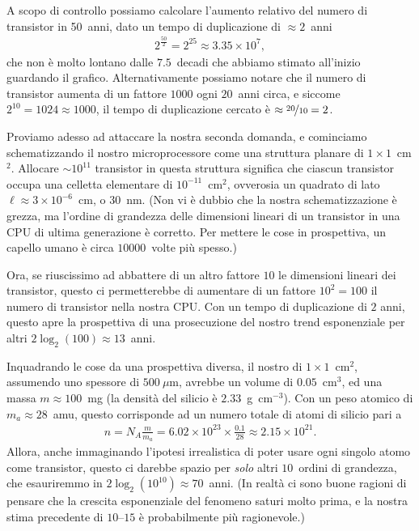 A scopo di controllo possiamo calcolare l'aumento relativo del numero di
transistor in 50~anni, dato un tempo di duplicazione di $\approx 2$~anni
\begin{align*}
  2^{\frac{50}{2}} = 2^{25} \approx 3.35 \times 10^7,
\end{align*}
che non è molto lontano dalle $7.5$~decadi che abbiamo stimato all'inizio
guardando il grafico. Alternativamente possiamo notare che il numero di
transistor aumenta di un fattore $1000$ ogni $20$~anni circa, e siccome
$2^{10} = 1024 \approx 1000$, il tempo di duplicazione cercato è
$\approx \nicefrac{20}{10} = 2$.

Proviamo adesso ad attaccare la nostra seconda domanda, e cominciamo schematizzando
il nostro microprocessore come una struttura planare di $1 \times 1$~cm$^2$.
Allocare $\sim 10^{11}$ transistor in questa struttura significa che
ciascun transistor occupa una celletta elementare di $10^{-11}$~cm$^2$, ovverosia
un quadrato di lato $\ell \approx 3 \times 10^{-6}$~cm, o $30$~nm. (Non vi è
dubbio che la nostra schematizzazione è grezza, ma l'ordine di grandezza delle
dimensioni lineari di un transistor in una CPU di ultima generazione è corretto.
Per mettere le cose in prospettiva, un capello umano è circa $10000$~volte
più spesso.)

Ora, se riuscissimo ad abbattere di un altro fattore $10$ le dimensioni lineari
dei transistor, questo ci permetterebbe di aumentare di un fattore $10^2 = 100$
il numero di transistor nella nostra CPU. Con un tempo di duplicazione di $2$
anni, questo apre la prospettiva di una prosecuzione del nostro trend esponenziale
per altri $2 \log_2(100) \approx 13$~anni.

Inquadrando le cose da una prospettiva diversa, il nostro  di
$1 \times 1$~cm$^2$, assumendo uno spessore di $500~\mu$m, avrebbe un volume di
$0.05$~cm$^3$, ed una massa $m \approx 100$~mg (la densità del silicio è $2.33$~g~cm$^{-3}$).
Con un peso atomico di $m_a \approx 28$~amu, questo corrisponde ad un numero totale
di atomi di silicio pari a
\begin{align*}
  n = N_A \frac{m}{m_a} = 6.02 \times 10^{23} \times \frac{0.1}{28} \approx 2.15 \times 10^{21}.
\end{align*}
Allora, anche immaginando l'ipotesi irrealistica di poter usare ogni singolo atomo
come transistor, questo ci darebbe spazio per \emph{solo} altri $10$~ordini di
grandezza, che esauriremmo in $2 \log_2(10^{10}) \approx 70$~anni. (In realtà
ci sono buone ragioni di pensare che la crescita esponenziale del fenomeno saturi
molto prima, e la nostra stima precedente di $10$--$15$ è probabilmente più
ragionevole.)


